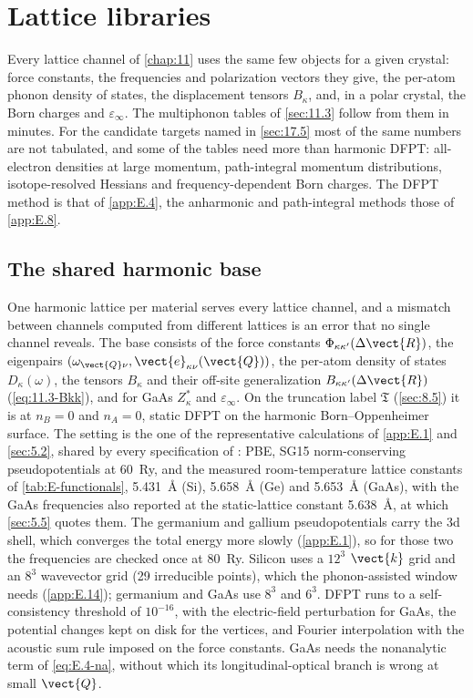 \section{Lattice libraries}\label{app:E.17}

Every lattice channel of \cref{chap:11} uses the same few objects for a given crystal: force constants, the frequencies and polarization vectors they give, the per-atom phonon density of states, the displacement tensors $B_\kappa$, and, in a polar crystal, the Born charges and $\varepsilon_\infty$. The multiphonon tables of \cref{sec:11.3} follow from them in minutes. For the candidate targets named in \cref{sec:17.5} most of the same numbers are not tabulated, and some of the tables need more than harmonic DFPT: all-electron densities at large momentum, path-integral momentum distributions, isotope-resolved Hessians and frequency-dependent Born charges. The DFPT method is that of \cref{app:E.4}, the anharmonic and path-integral methods those of \cref{app:E.8}.

\subsection{The shared harmonic base}

One harmonic lattice per material serves every lattice channel, and a mismatch between channels computed from different lattices is an error that no single channel reveals. The base consists of the force constants $\Phi_{\kappa\kappa'}(\Delta\vect{R})$, the eigenpairs $(\omega_{\vect{Q}\nu},\vect{e}_{\kappa\nu}(\vect{Q}))$, the per-atom density of states $D_\kappa(\omega)$, the tensors $B_\kappa$ and their off-site generalization $B_{\kappa\kappa'}(\Delta\vect{R})$ (\cref{eq:11.3-Bkk}), and for GaAs $Z^*_\kappa$ and $\varepsilon_\infty$. On the truncation label $\mathfrak{T}$ (\cref{sec:8.5}) it is at $n_B = 0$ and $n_A = 0$, static DFPT on the harmonic Born--Oppenheimer surface. The setting is the one of the representative calculations of \cref{app:E.1} and \cref{sec:5.2}, shared by every specification of : PBE, SG15 norm-conserving pseudopotentials at \SI{60}{Ry}, and the measured room-temperature lattice constants of \cref{tab:E-functionals}, \SI{5.431}{\angstrom} (Si), \SI{5.658}{\angstrom} (Ge) and \SI{5.653}{\angstrom} (GaAs), with the GaAs frequencies also reported at the static-lattice constant \SI{5.638}{\angstrom}, at which \cref{sec:5.5} quotes them. The germanium and gallium pseudopotentials carry the 3d shell, which converges the total energy more slowly (\cref{app:E.1}), so for those two the frequencies are checked once at \SI{80}{Ry}. Silicon uses a $12^3$ $\vect{k}$ grid and an $8^3$ wavevector grid (29 irreducible points), which the phonon-assisted window needs (\cref{app:E.14}); germanium and GaAs use $8^3$ and $6^3$. DFPT runs to a self-consistency threshold of $10^{-16}$, with the electric-field perturbation for GaAs, the potential changes kept on disk for the vertices, and Fourier interpolation with the acoustic sum rule imposed on the force constants. GaAs needs the nonanalytic term of \cref{eq:E.4-na}, without which its longitudinal-optical branch is wrong at small $\vect{Q}$.

